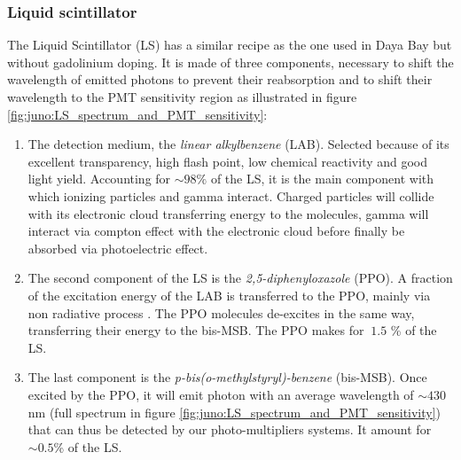 \documentclass[../main.tex]{subfiles}
\begin{document}
\subsubsection{Liquid scintillator}
\label{sec:juno:LS}

The Liquid Scintillator (LS) has a similar recipe as the one used in Daya Bay \cite{bay_optimization_2020} but without gadolinium doping. It is made of three components, necessary to shift the wavelength of emitted photons to prevent their reabsorption and to shift their wavelength to the PMT sensitivity region as illustrated in figure \ref{fig:juno:LS_spectrum_and_PMT_sensitivity}:
\begin{enumerate}
  \item The detection medium, the \textit{linear alkylbenzene} (LAB). Selected because of its excellent transparency, high flash point, low chemical reactivity and good light yield. Accounting for $\sim 98\%$ of the LS, it is the main component with which ionizing particles and gamma interact. Charged particles will collide with its electronic cloud transferring energy to the molecules, gamma will interact via compton effect with the electronic cloud before finally be absorbed via photoelectric effect.
  \item The second component of the LS is the \textit{2,5-diphenyloxazole} (PPO). A fraction of the excitation energy of the LAB is transferred to the PPO, mainly via non radiative process \cite{birks_chapter_1964}. The PPO molecules de-excites in the same way, transferring their energy to the bis-MSB. The PPO makes for $~1.5$ \% of the LS.
  \item The last component is the \textit{p-bis(o-methylstyryl)-benzene} (bis-MSB). Once excited by the PPO, it will emit photon with an average wavelength of $\sim430$ nm (full spectrum in figure \ref{fig:juno:LS_spectrum_and_PMT_sensitivity}) that can thus be detected by our photo-multipliers systems. It amount for $\sim 0.5$\% of the LS.
\end{enumerate}
\end{document}
